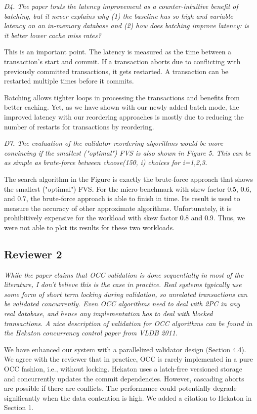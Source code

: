 \documentclass{article}
\begin{document}
\emph{D4. The paper touts the latency improvement as a counter-intuitive benefit of batching, but it never explains why (1) the baseline has so high and variable latency on an in-memory database and (2) how does batching improve latency: is it better lower cache miss rates?}

This is an important point. The latency is measured as the time between a transaction's start and commit. If a transaction aborts due to conflicting with previously committed transactions, it gets restarted. A transaction can be restarted multiple times before it commits. 

Batching allows tighter loops in processing the transactions and benefits from better caching. Yet, as we have shown with our newly added batch mode, the improved latency with our reordering approaches is mostly due to reducing the number of restarts for transactions by reordering.

\emph{D7. The evaluation of the validator reordering algorithms would be more convincing if the smallest ("optimal") FVS is also shown in Figure 5. This can be as simple as brute-force between choose(150, i) choices for i=1,2,3.}

The search algorithm in the Figure is exactly the brute-force approach that shows the smallest ("optimal") FVS. For the micro-benchmark with skew factor 0.5, 0.6, and 0.7, the brute-force approach is able to finish in time. Its result is used to measure the accuracy of other approximate algorithms. Unfortunately, it is prohibitively expensive for the workload with skew factor 0.8 and 0.9. Thus, we were not able to plot its results for these two workloads.

\subsection{Reviewer 2}


\emph{While the paper claims that OCC validation is done sequentially in most of the literature, I don't believe this is the case in practice. Real systems typically use some form of short term locking during validation, so unrelated transactions can be validated concurrently. Even OCC algorithms need to deal with 2PC in any real database, and hence any implementation has to deal with blocked transactions. A nice description of validation for OCC algorithms can be found in the Hekaton concurrency control paper from VLDB 2011. }

We have enhanced our system with a parallelized validator design (Section 4.4). We agree with the reviewer that in practice, OCC is rarely implemented in a pure OCC fashion, i.e., without locking. Hekaton uses a latch-free versioned storage and concurrently updates the commit dependencies. However, cascading aborts are possible if there are conflicts. The performance could potentially degrade significantly when the data contention is high. We added a citation to Hekaton in Section 1.
\end{document}
